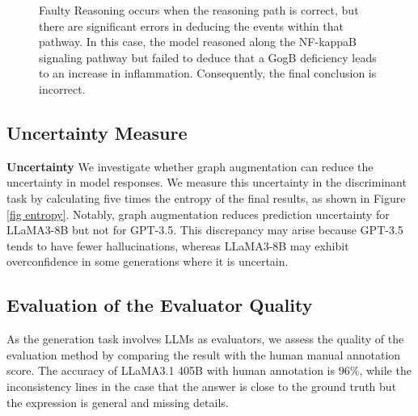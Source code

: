 \begin{figure}[!h]
    \vspace{0.01cm}
    \caption{Faulty Reasoning occurs when the reasoning path is correct, but there are significant errors in deducing the events within that pathway. In this case, the model reasoned along the NF-kappaB signaling pathway but failed to deduce that a GogB deficiency leads to an increase in inflammation. Consequently, the final conclusion is incorrect.}
\end{figure}



\subsection{Uncertainty Measure}

\textbf{Uncertainty} We investigate whether graph augmentation can reduce the uncertainty in model responses. We measure this uncertainty in the discriminant task by calculating five times the entropy of the final results, as shown in Figure \ref{fig entropy}. Notably, graph augmentation reduces prediction uncertainty for LLaMA3-8B but not for GPT-3.5. This discrepancy may arise because GPT-3.5 tends to have fewer hallucinations, whereas LLaMA3-8B may exhibit overconfidence in some generations where it is uncertain.

\begin{figure*}[!t]
    \centering    
    \renewcommand{\thesubfigure}{} %
    \caption{Uncertainty measured by entropy.}
    \label{fig entropy}
\end{figure*}

\textbf{} \label{subsection evaluator quality}


\subsection{Evaluation of the Evaluator Quality}

As the generation task involves LLMs as evaluators, we assess the quality of the evaluation method by comparing the result with the human manual annotation score. The accuracy of LLaMA3.1 405B with human annotation is $96\%$, while the inconsistency lines in the case that the answer is close to the ground truth but the expression is general and missing details.

